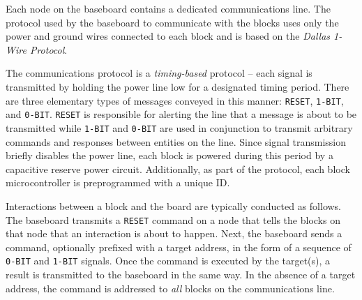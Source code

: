 Each node on the baseboard contains a dedicated communications line. The protocol used by the baseboard to communicate with the blocks uses only the power and ground wires connected to each block and is based on the \emph{Dallas 1-Wire Protocol}.

The communications protocol is a \emph{timing-based} protocol -- each signal is transmitted by holding the power line low for a designated timing period. There are three elementary types of messages conveyed in this manner: \texttt{RESET}, \texttt{1-BIT}, and \texttt{0-BIT}. \texttt{RESET} is responsible for alerting the line that a message is about to be transmitted while \texttt{1-BIT} and \texttt{0-BIT} are used in conjunction to transmit arbitrary commands and responses between entities on the line. Since signal transmission briefly disables the power line, each block is powered during this period by a capacitive reserve power circuit. Additionally, as part of the protocol, each block microcontroller is preprogrammed with a unique ID.

Interactions between a block and the board are typically conducted as follows. The baseboard transmits a \texttt{RESET} command on a node that tells the blocks on that node that an interaction is about to happen. Next, the baseboard sends a command, optionally prefixed with a target address, in the form of a sequence of \texttt{0-BIT} and \texttt{1-BIT} signals. Once the command is executed by the target(s), a result is transmitted to the baseboard in the same way. In the absence of a target address, the command is addressed to \emph{all} blocks on the communications line.